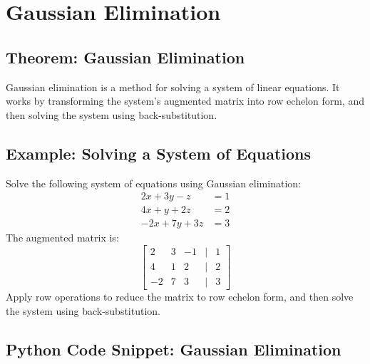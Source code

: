 \section{Gaussian Elimination}

\subsection{Theorem: Gaussian Elimination}
\begin{theorem}
Gaussian elimination is a method for solving a system of linear equations. It works by transforming the system's augmented matrix into row echelon form, and then solving the system using back-substitution.
\end{theorem}

\subsection{Example: Solving a System of Equations}
\begin{example}
Solve the following system of equations using Gaussian elimination:
\[
\begin{aligned}
    2x + 3y - z &= 1 \\
    4x + y + 2z &= 2 \\
    -2x + 7y + 3z &= 3
\end{aligned}
\]
The augmented matrix is:
\[
\begin{bmatrix}
2 & 3 & -1 & | & 1 \\
4 & 1 & 2 & | & 2 \\
-2 & 7 & 3 & | & 3
\end{bmatrix}
\]
Apply row operations to reduce the matrix to row echelon form, and then solve the system using back-substitution.
\end{example}

\subsection{Python Code Snippet: Gaussian Elimination}
\begin{codesnippet}
\end{codesnippet}